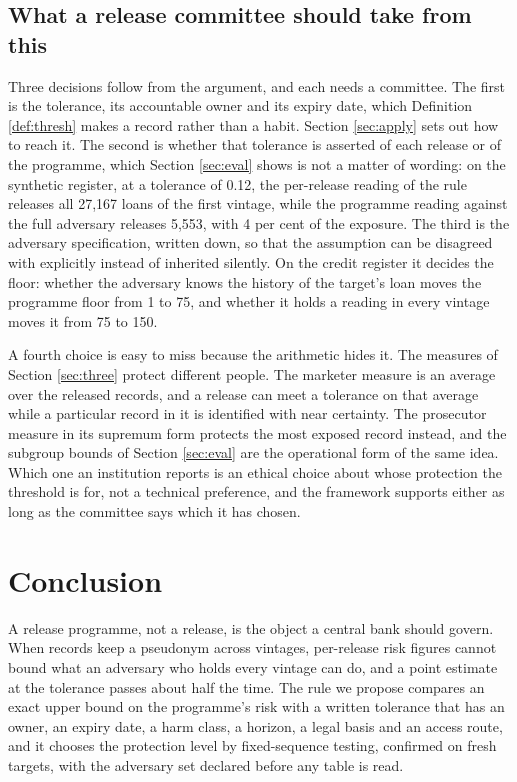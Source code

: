 \documentclass[11pt,a4paper]{article}
\theoremstyle{plain}
\theoremstyle{definition}
\theoremstyle{definition}
\theoremstyle{plain}
\begin{document}
\subsection{What a release committee should take from this}

Three decisions follow from the argument, and each needs a committee. The first is the tolerance, its accountable owner and its expiry date,
which Definition \ref{def:thresh} makes a record rather than a habit. Section \ref{sec:apply} sets out how to reach it. The
second is whether that tolerance is asserted of each release or of the programme,
which Section \ref{sec:eval} shows is not a matter of wording: on the synthetic
register, at a tolerance of 0.12, the per-release reading of the rule releases all
27{,}167 loans of the first vintage, while the programme reading against the full
adversary releases 5{,}553, with 4 per cent of the exposure. The third is the
adversary specification, written down, so that the assumption can be disagreed
with explicitly instead of inherited silently. On the credit register it decides
the floor: whether the adversary knows the history of the target's loan moves the
programme floor from 1 to 75, and whether it holds a reading in every vintage
moves it from 75 to 150.

A fourth choice is easy to miss because the arithmetic hides it. The measures of
Section \ref{sec:three} protect different people. The marketer measure is an
average over the released records, and a release can meet a tolerance on that
average while a particular record in it is identified with near certainty. The
prosecutor measure in its supremum form protects the most exposed record instead,
and the subgroup bounds of Section \ref{sec:eval} are the operational form of
the same idea. Which one an institution reports is an ethical choice about whose
protection the threshold is for, not a technical preference, and the framework
supports either as long as the committee says which it has chosen.

\section{Conclusion}\label{sec:conclusion}

A release programme, not a release, is the object a central bank should govern.
When records keep a pseudonym across vintages, per-release risk figures cannot
bound what an adversary who holds every vintage can do, and a point estimate at
the tolerance passes about half the time. The rule we propose compares an exact
upper bound on the programme's risk with a written tolerance that has an owner,
an expiry date, a harm class, a horizon, a legal basis and an access route, and
it chooses the protection level by fixed-sequence testing, confirmed on fresh
targets, with the adversary set declared before any table is read.
\end{document}
